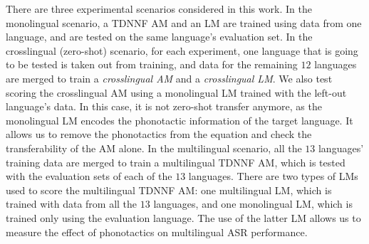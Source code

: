 \documentclass{article}
\begin{document}


There are three experimental scenarios considered in this work.
In the monolingual scenario, a TDNNF AM and an LM are trained using data from one language, and are tested on the same language's evaluation set. 
In the crosslingual (zero-shot) scenario, for each experiment, one language that is going to be tested is taken out from training, and data for the remaining $12$ languages are merged to train a \textit{crosslingual AM} and a \textit{crosslingual LM}. We also test scoring the crosslingual AM using a monolingual LM trained with the left-out language's data.
In this case, it is not zero-shot transfer anymore, as the monolingual LM encodes the phonotactic information of the target language. It allows us to remove the phonotactics from the equation and check the transferability of the AM alone.
In the multilingual scenario, all the $13$ languages' training data are merged to train a multilingual TDNNF AM, which is tested with the evaluation sets of each of the $13$ languages. 
There are two types of LMs used to score the multilingual TDNNF AM: one multilingual LM, which is trained with data from all the $13$ languages, and one monolingual LM, which is trained only using the evaluation language. The use of the latter LM allows us to measure the effect of phonotactics on multilingual ASR performance.



\end{document}
